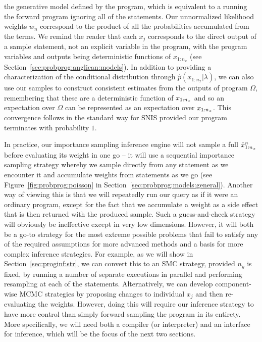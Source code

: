 the generative model defined by the program, which is equivalent to a running the forward program
ignoring all of the \observe statements.  Our unnormalized likelihood weights $w_n$ correspond to the
product of all the probabilities accumulated from the \observe terms.  We remind the reader that each 
$x_j$ corresponds to the direct output of a sample statement, not an explicit variable in the program, 
with the program variables and outputs being deterministic functions of $x_{1:n_x}$ (see 
Section~\ref{sec:probprog:anglican:models}). In addition to providing a 
characterization of the conditional distribution through $\hat{p}(x_{1:n_x} | \lambda)$, we can also
use our samples to construct consistent estimates from the outputs of program $\Omega$, remembering
that these are a deterministic function of $x_{1:n_x}$ and so an expectation over $\Omega$ can be
represented as an expectation over $x_{1:n_x}$.
This convergence follows in the standard way for SNIS provided our program terminates with probability $1$.

In practice, our importance sampling inference engine will not sample a full $\hat{x}_{1:n_x}^n$ before 
evaluating its weight in one go -- it will use a
sequential importance sampling strategy whereby we sample directly from any \sample statement as we encounter it
and accumulate weights from \observe statements as we go (see Figure~\ref{fig:probprog:poisson} in
Section~\ref{sec:probprog:models:general}).
Another way of viewing this is that we will repeatedly run our query as if it were an ordinary
program, except for the fact that we accumulate a weight as a side effect that is then returned with
the produced sample.  Such a guess-and-check strategy will obviously be ineffective except in very low
dimensions.  However, it will both be a go-to strategy for the most extreme possible problems that
fail to satisfy any of the required assumptions for more advanced methods and a basis for more complex 
inference strategies.  For example, as we will show in Section~\ref{sec:proginf:str}, we can
convert this to an SMC strategy, provided $n_y$ is fixed, by running a number of separate executions
in parallel and performing resampling at each of the \observe statements.  Alternatively, we can
develop component-wise MCMC strategies by proposing changes to individual $x_j$ and then
re-evaluating the weights.  However, doing this will require our inference strategy to have more
control than simply forward sampling the program in its entirety.  More specifically, we will need both a compiler
(or interpreter) and an interface for inference, which will be the focus of the next two sections.